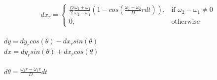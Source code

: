 \documentclass[a4paper,12pt]{article}
\begin{document}
\[
    dx_r= 
\begin{cases}
    \frac{D}{2}\frac{\omega_{2}+\omega_{1}}{\omega_{2}-\omega_{1}} (1 - cos(\frac{\omega_1 - \omega_2}{D}rdt)),& \text{if } \omega_{2}-\omega_{1} \neq 0\\
    0,              & \text{otherwise}
\end{cases}
\]\\
$dy = dy_r cos(\theta) - dx_r sin(\theta)$\\
$dx = dy_r sin(\theta) + dx_r cos(\theta)$\\\\
$d\theta= \frac{\omega_{2}r - \omega_{1}r}{D} dt$
\end{document}
